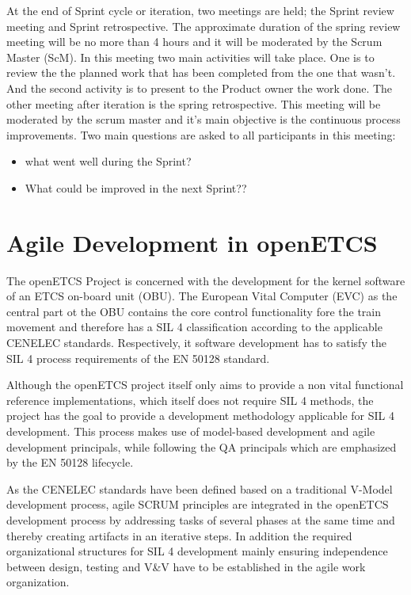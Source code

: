 At the end of Sprint cycle or iteration, two meetings are held; the Sprint review meeting and Sprint retrospective. The approximate duration of the spring review meeting will be no more than 4 hours and it will be moderated by the Scrum Master (ScM). In this meeting two main activities will take place. One is to review the the planned work that has been completed from the one that wasn't. And the second activity is to present to the Product owner the work done. The other meeting after iteration is the spring retrospective. This meeting will be moderated by the scrum master and it's main objective is the continuous process improvements. Two main questions are asked to all participants in this meeting:
\begin{itemize}
\item   what went well during the Sprint? 
\item What could be improved in the next Sprint?? 
\end{itemize}


\chapter{Agile Development in openETCS}
\label{sec:agile}

The openETCS Project is concerned with the development for the kernel software of an ETCS on-board unit (OBU). The European Vital Computer (EVC) as the central part ot the OBU contains the core control functionality fore the train movement and therefore has a SIL 4 classification according to the applicable CENELEC standards. Respectively, it software development has to satisfy the SIL 4 process requirements of the EN 50128 standard. 

Although the openETCS project itself only aims to provide a non vital functional reference implementations, which itself does not require SIL 4 methods, the project has the goal to provide a development methodology applicable for SIL 4 development. This process makes use of model-based development and agile development principals, while following the QA principals which are emphasized by the EN 50128 lifecycle. 

As the CENELEC standards have been defined based on a traditional V-Model development process, agile SCRUM principles are integrated in the openETCS development process by addressing tasks of several phases at the same time and thereby creating artifacts in an iterative steps. In addition the required organizational structures for SIL 4 development mainly ensuring independence between design, testing and V\&V have to be established in the agile work organization.

